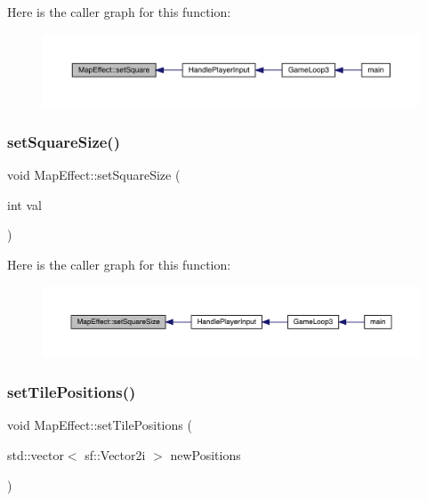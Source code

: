 Here is the caller graph for this function\+:
\nopagebreak
\begin{figure}[H]
\begin{center}
\leavevmode
\includegraphics[width=350pt]{de/de4/class_map_effect_a4c382be68e0b9dae8fb1f216c8cfc9a6_icgraph}
\end{center}
\end{figure}
\mbox{\label{class_map_effect_adfa0231021b37a4fe775f33330454cb2}} 
\subsubsection{\texorpdfstring{set\+Square\+Size()}{setSquareSize()}}
{\footnotesize\ttfamily void Map\+Effect\+::set\+Square\+Size (\begin{DoxyParamCaption}\item[{int}]{val }\end{DoxyParamCaption})}

Here is the caller graph for this function\+:
\nopagebreak
\begin{figure}[H]
\begin{center}
\leavevmode
\includegraphics[width=350pt]{de/de4/class_map_effect_adfa0231021b37a4fe775f33330454cb2_icgraph}
\end{center}
\end{figure}
\mbox{\label{class_map_effect_af79dd085aefbd1cdd92e9e9aa695592a}} 
\subsubsection{\texorpdfstring{set\+Tile\+Positions()}{setTilePositions()}}
{\footnotesize\ttfamily void Map\+Effect\+::set\+Tile\+Positions (\begin{DoxyParamCaption}\item[{std\+::vector$<$ sf\+::\+Vector2i $>$}]{new\+Positions }\end{DoxyParamCaption})}



